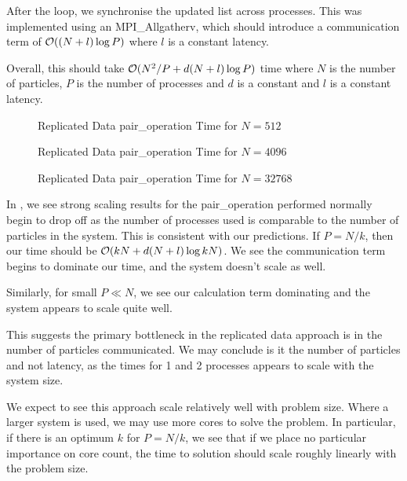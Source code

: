 After the loop, we synchronise the updated list across processes.
This was implemented using an MPI\_Allgatherv, which
should introduce a communication term of $\mathcal{O}{((N + l)\log{P})}$
where $l$ is a constant latency.

Overall, this should take $\mathcal{O}{(N^2/P + d(N+l)\log{P})}$ time
where $N$ is the number of particles,
$P$ is the number of processes and
$d$ is a constant and
$l$ is a constant latency.

\begin{figure}
    
    \caption{Replicated Data pair\_operation Time for $N = 512$}
    \label{fig:v0_replicated_pair_operation_512_logtime}
\end  {figure}

\begin{figure}
    
    \caption{Replicated Data pair\_operation Time for $N = 4096$}
    \label{fig:v0_replicated_pair_operation_4096_logtime}
\end  {figure}

\begin{figure}
    
    \caption{Replicated Data pair\_operation Time for $N = 32768$}
    \label{fig:v0_replicated_pair_operation_32768_logtime}
\end  {figure}

In , we see strong scaling results
for the pair\_operation performed normally begin to drop off as the number
of processes used is comparable to the number of particles in the system.
%
This is consistent with our predictions.
%
If $P = N/k$, then our time should be $\mathcal{O}{(kN + d(N+l)\log{kN})}$.
%
We see the communication term begins to dominate our time, and
the system doesn't scale as well.

Similarly, for small $P \ll{} N$, we see our calculation term dominating
and the system appears to scale quite well.

This suggests the primary bottleneck in the replicated data approach
is in the number of particles communicated.
%
We may conclude is it the number of particles and not latency, as the
times for 1 and 2 processes appears to scale with the system size.

We expect to see this approach scale relatively well
with problem size.
%
Where a larger system is used, we may use more cores to solve the problem.
%
In particular, if there is an optimum $k$ for $P = N/k$, we see that
if we place no particular importance on core count, the time to solution
should scale roughly linearly with the problem size.

